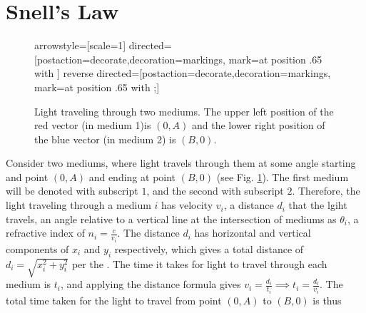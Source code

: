 \section{Snell's Law}

\begin{figure}
\centering

\usetikzlibrary{decorations.markings}
\tikzstyle arrowstyle=[scale=1]
\tikzstyle directed=[postaction={decorate,decoration={markings,
    mark=at position .65 with {}}}]
\tikzstyle reverse directed=[postaction={decorate,decoration={markings,
    mark=at position .65 with {;}}}]
\caption{\footnotesize Light traveling through two mediums. The upper left position of the red vector (in medium 1)is $(0,A)$ and the lower right position of the blue vector (in medium 2) is $(B,0)$.}
\label{fig:snells_law}
\end{figure}

Consider two mediums, where light travels through them at some angle starting and point $(0, A)$ and ending at point $(B, 0)$ (see Fig. \ref{fig:snells_law}). The first medium will be denoted with subscript $1$, and the second with subscript $2$. Therefore, the light traveling through a medium $i$ has velocity $v_i$, a distance $d_i$ that the lgiht travels, an angle relative to a vertical line at the intersection of mediums as $\theta_i$, a refractive index of $n_i = \frac{c}{v_i}$. The distance $d_i$ has horizontal and vertical components of $x_i$ and $y_i$ respectively, which gives a total distance of $d_i = \sqrt{x_i^2+y_i^2}$ per the . The time it takes for light to travel through each medium is $t_i$, and applying the distance formula gives $v_i = \frac{d_i}{t_i} \implies t_i = \frac{d_i}{v_i}$. The total time taken for the light to travel from point $(0, A)$ to $(B, 0)$ is thus 

